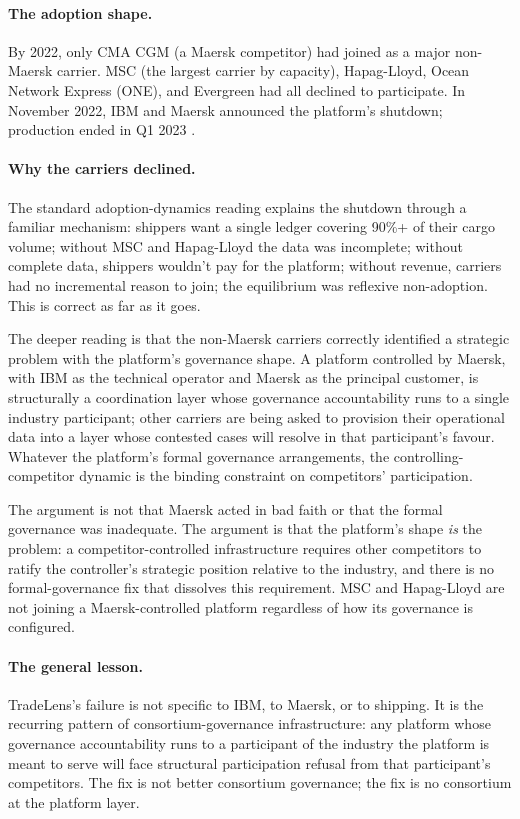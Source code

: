 \documentclass[11pt,a4paper]{article}
\theoremstyle{definition}
\theoremstyle{remark}
\begin{document}
\paragraph{The adoption shape.}
By 2022, only CMA CGM (a Maersk competitor) had joined as a major
non-Maersk carrier. MSC (the largest carrier by capacity),
Hapag-Lloyd, Ocean Network Express (ONE), and Evergreen had all
declined to participate. In November 2022, IBM and Maersk
announced the platform's shutdown; production ended in Q1 2023
\citep{lloyd_loadstar_2022}.

\paragraph{Why the carriers declined.}
The standard adoption-dynamics reading explains the shutdown
through a familiar mechanism: shippers want a single ledger
covering 90\%+ of their cargo volume; without MSC and Hapag-Lloyd
the data was incomplete; without complete data, shippers wouldn't
pay for the platform; without revenue, carriers had no
incremental reason to join; the equilibrium was reflexive
non-adoption. This is correct as far as it goes.

The deeper reading is that the non-Maersk carriers correctly
identified a strategic problem with the platform's governance
shape. A platform controlled by Maersk, with IBM as the technical
operator and Maersk as the principal customer, is structurally a
coordination layer whose governance accountability runs to a
single industry participant; other carriers are being asked to
provision their operational data into a layer whose contested
cases will resolve in that participant's favour. Whatever the
platform's formal governance arrangements, the
controlling-competitor dynamic is the binding constraint on
competitors' participation.

The argument is not that Maersk acted in bad faith or that the
formal governance was inadequate. The argument is that the
platform's shape \emph{is} the problem: a competitor-controlled
infrastructure requires other competitors to ratify the
controller's strategic position relative to the industry, and
there is no formal-governance fix that dissolves this
requirement. MSC and Hapag-Lloyd are not joining a Maersk-controlled
platform regardless of how its governance is configured.

\paragraph{The general lesson.}
TradeLens's failure is not specific to IBM, to Maersk, or to
shipping. It is the recurring pattern of consortium-governance
infrastructure: any platform whose governance accountability runs
to a participant of the industry the platform is meant to serve
will face structural participation refusal from that
participant's competitors. The fix is not better consortium
governance; the fix is no consortium at the platform layer.
\end{document}
